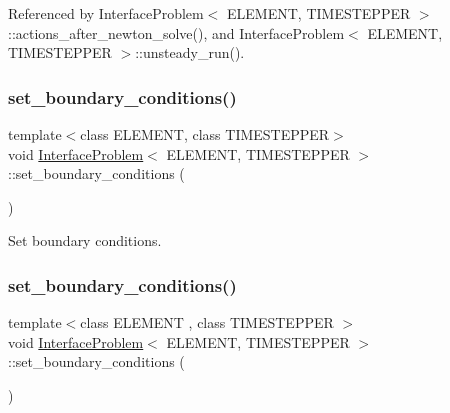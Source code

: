 Referenced by Interface\+Problem$<$ E\+L\+E\+M\+E\+N\+T, T\+I\+M\+E\+S\+T\+E\+P\+P\+E\+R $>$\+::actions\+\_\+after\+\_\+newton\+\_\+solve(), and Interface\+Problem$<$ E\+L\+E\+M\+E\+N\+T, T\+I\+M\+E\+S\+T\+E\+P\+P\+E\+R $>$\+::unsteady\+\_\+run().

\mbox{\label{classInterfaceProblem_a844445832ad7a32aa9f5d03ffdb40ebb}} 
\subsubsection{\texorpdfstring{set\+\_\+boundary\+\_\+conditions()}{set\_boundary\_conditions()}\hspace{0.1cm}{\footnotesize\ttfamily [1/2]}}
{\footnotesize\ttfamily template$<$class E\+L\+E\+M\+E\+NT, class T\+I\+M\+E\+S\+T\+E\+P\+P\+ER$>$ \\
void \hyperlink{classInterfaceProblem}{Interface\+Problem}$<$ E\+L\+E\+M\+E\+NT, T\+I\+M\+E\+S\+T\+E\+P\+P\+ER $>$\+::set\+\_\+boundary\+\_\+conditions (\begin{DoxyParamCaption}{ }\end{DoxyParamCaption})}



Set boundary conditions. 

\mbox{\label{classInterfaceProblem_a844445832ad7a32aa9f5d03ffdb40ebb}} 
\subsubsection{\texorpdfstring{set\+\_\+boundary\+\_\+conditions()}{set\_boundary\_conditions()}\hspace{0.1cm}{\footnotesize\ttfamily [2/2]}}
{\footnotesize\ttfamily template$<$class E\+L\+E\+M\+E\+NT , class T\+I\+M\+E\+S\+T\+E\+P\+P\+ER $>$ \\
void \hyperlink{classInterfaceProblem}{Interface\+Problem}$<$ E\+L\+E\+M\+E\+NT, T\+I\+M\+E\+S\+T\+E\+P\+P\+ER $>$\+::set\+\_\+boundary\+\_\+conditions (\begin{DoxyParamCaption}{ }\end{DoxyParamCaption})}



